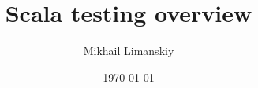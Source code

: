 \documentclass{beamer}
\title{Scala testing overview}
\author{Mikhail Limanskiy}
\institute{SymphonyTeleca}
\date{\today}
\begin{document}
\begin{frame}
    \titlepage
\end{frame}


\end{document}
